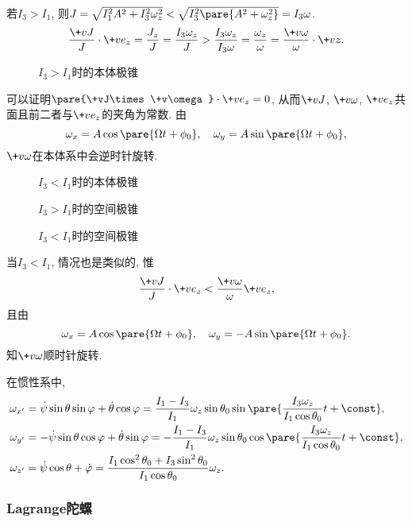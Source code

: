 \documentclass[../LectureNotes.tex]{subfiles}
\begin{document}
若$I_3 > I_1$, 则$J = \sqrt{I_1^2 A^2 + I_3^2\omega_z^2} < \sqrt{I_3^2\pare{A^2 + \omega_z^2}} = I_3\omega$.
\[ \frac{\+vJ}{J}\cdot \+ve_z = \frac{J_z}{J} = \frac{I_3\omega_z}{J} > \frac{I_3\omega_z}{I_3\omega} = \frac{\omega_z}{\omega} = \frac{\+v\omega}{\omega}\cdot \+vz. \]
\begin{figure}[ht]
    \centering
    \caption{$I_3 > I_1$时的本体极锥}
\end{figure}
可以证明$\pare{\+vJ\times\+v\omega}\cdot\+ve_z = 0$, 从而$\+vJ$, $\+v\omega$, $\+ve_z$共面且前二者与$\+ve_z$的夹角为常数. 由
\[ \omega_x = A\cos\pare{\Omega t + \phi_0},\quad \omega_y = A\sin\pare{\Omega t + \phi_0}, \]
$\+v\omega$在本体系中会逆时针旋转.
\begin{figure}[ht]
    \centering
    \caption{$I_3 < I_1$时的本体极锥}
\end{figure}
\begin{figure}[ht]
    \centering
    \caption{$I_3>I_1$时的空间极锥}
\end{figure}
\begin{figure}[ht]
    \centering
    \caption{$I_3<I_1$时的空间极锥}
\end{figure}
当$I_3 < I_1$, 情况也是类似的, 惟
\[ \frac{\+vJ}{J}\cdot \+ve_z < \frac{\+v\omega}{\omega}\+ve_z, \]
且由
\[ \omega_x = A\cos\pare{\Omega t + \phi_0},\quad \omega_y = -A\sin\pare{\Omega t + \phi_0}. \]
知$\+v\omega$顺时针旋转.
\par
在惯性系中,
\begin{align*}
    \omega_{x'} &= \dot\psi\sin\theta\sin\varphi + \dot\theta\cos\varphi = \frac{I_1-I_3}{I_1}\omega_z \sin\theta_0 \sin\pare{\frac{I_3\omega_z}{I_1\cos\theta_0}t + \const}, \\
    \omega_{y'} &= -\dot\psi\sin\theta\cos\varphi + \dot\theta\sin\varphi = -\frac{I_1-I_3}{I_1}\omega_z \sin\theta_0 \cos\pare{\frac{I_3\omega_z}{I_1\cos\theta_0}t + \const}, \\
    \omega_{z'} &= \dot\psi\cos\theta + \dot\varphi = \frac{I_1\cos^2\theta_0 + I_3\sin^2\theta_0}{I_1\cos\theta_0}\omega_z.
\end{align*}



\subsubsection{Lagrange陀螺} %
\label{ssub:lagrange陀螺}
\end{document}
